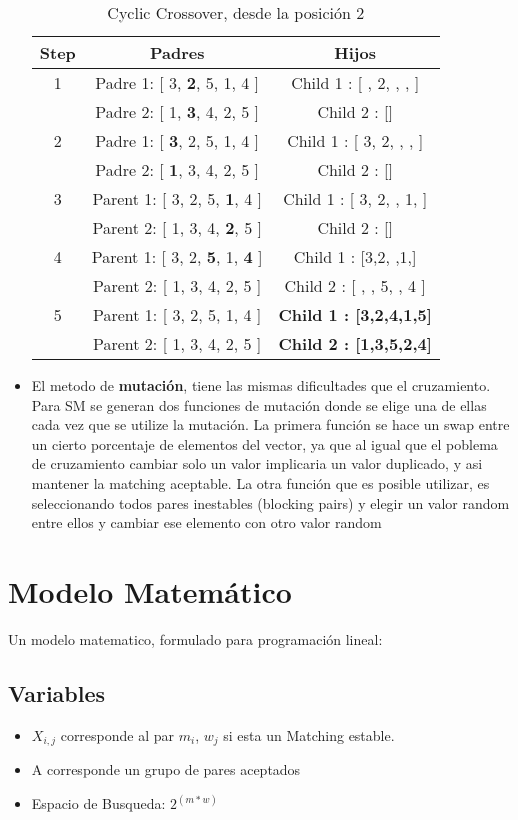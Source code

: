 \documentclass[letter, 10pt]{article}
\begin{document}
\begin{itemize}
\begin{table}[!h]
\centering
\begin{tabular}{|c|c|c|}
Step & Padres & Hijos \\ \hline
1 & Padre 1: [ 3, \textbf{2}, 5, 1, 4 ] & Child 1 : [ , 2, , , ] \\
  & Padre 2: [ 1, \textbf{3}, 4, 2, 5 ] & Child 2 : [] \\ \hline
2 & Padre 1: [ \textbf{3}, 2, 5, 1, 4 ] & Child 1 : [ 3, 2, , , ] \\
  & Padre 2: [ \textbf{1}, 3, 4, 2, 5 ] & Child 2 : [] \\ \hline
3 & Parent 1: [ 3, 2, 5, \textbf{1}, 4 ] & Child 1 : [ 3, 2, , 1, ] \\
  & Parent 2: [ 1, 3, 4, \textbf{2}, 5 ] & Child 2 : [] \\ \hline
4 & Parent 1: [ 3, 2, \textbf{5}, 1, \textbf{4} ] & Child 1 : [3,2, ,1,] \\ 
  & Parent 2: [ 1, 3, 4, 2, 5 ] & Child 2 : [ , , 5, , 4 ] \\ \hline
5 & Parent 1: [ 3, 2, 5, 1, 4 ] & \textbf{Child 1 : [3,2,4,1,5]} \\ 
  & Parent 2: [ 1, 3, 4, 2, 5 ] & \textbf{Child 2 : [1,3,5,2,4]} \\ \hline
\end{tabular}
\caption{Cyclic Crossover, desde la posici\'on 2\cite{ThesisIoannis10}}
\end{table}


\item El metodo de \textbf{mutaci\'on}, tiene las mismas dificultades que el cruzamiento. Para SM se generan dos funciones de 
mutaci\'on donde se elige una de ellas cada vez que se utilize la mutaci\'on. La primera funci\'on se hace un swap entre un cierto 
porcentaje de elementos del vector, ya que al igual que el poblema de cruzamiento cambiar solo un valor implicaria un valor duplicado, 
y asi mantener la matching aceptable. La otra funci\'on que es posible utilizar, es seleccionando todos pares inestables (blocking
pairs) y elegir un valor random entre ellos y cambiar ese elemento con otro valor random
\end{itemize}

\section{Modelo Matem\'atico}
Un modelo matematico, formulado para programaci\'on lineal:\cite{ThesisPodhradsky10}
\subsection{Variables}
\begin{itemize}
\item $X_{i,j}$ corresponde al par $m_i$, $w_j$ si esta un Matching estable.\\
\item A corresponde un grupo de pares aceptados
\item Espacio de Busqueda: $2^{(m*w)}$
\end{itemize}
\end{document}
